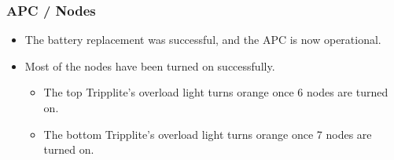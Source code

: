 \documentclass{beamer}
\begin{document}
\begin{frame}
  \frametitle{APC / Nodes}

  \begin{itemize}
  \item The battery replacement was successful, and the APC is now operational.
  \item Most of the nodes have been turned on successfully.
    \begin{itemize}
    \item The top Tripplite's overload light turns orange once 6 nodes are turned on.
    \item The bottom Tripplite's overload light turns orange once 7 nodes are turned on.
    \end{itemize}
  \end{itemize}

\end{frame}

\end{document}
